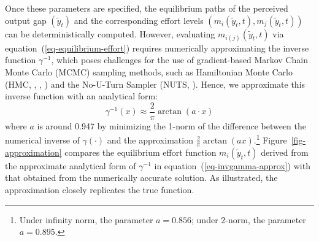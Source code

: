\documentclass[mnsc]{informs3}
\begin{document}
Once these parameters are specified, the equilibrium paths of the perceived output gap $(\tilde{y}_t)$ and the corresponding effort levels $(m_i(\tilde{y}_t, t), m_j(\tilde{y}_t, t))$ can be deterministically computed. 
However, evaluating $m_{i(j)}(\tilde{y}_t, t)$ via equation~(\ref{eq-equilibrium-effort}) requires numerically approximating the inverse function $\gamma^{-1}$, which poses challenges for the use of gradient-based Markov Chain Monte Carlo (MCMC) sampling methods, such as Hamiltonian Monte Carlo (HMC, \citealt{neal1996bayesian}, \citealt{neal2011mcmc}, \citealt{betancourt2017conceptual}) and the No-U-Turn Sampler (NUTS, \citealt{hoffman2014NUTS}).
Hence, we approximate this inverse function with an analytical form:
\begin{equation}\label{eq-invgamma-approx}
\gamma^{-1}(x) \approx \frac{2}{\pi}\arctan(a \cdot x)
\end{equation}
where $a$ is around 0.947 by minimizing the 1-norm of the difference between the numerical inverse of $\gamma(\cdot)$ and the approximation $\frac{2}{\pi} \arctan(a x).$\footnote{Under infinity norm, the parameter $a = 0.856$; under 2-norm, the parameter $a=0.895$.}
Figure~\ref{fig-approximation} compares the equilibrium effort function $m_i(\tilde{y}_t, t)$ derived from the approximate analytical form of $\gamma^{-1}$ in equation~(\ref{eq-invgamma-approx}) with that obtained from the numerically accurate solution.
As illustrated, the approximation closely replicates the true function.
\end{document}
